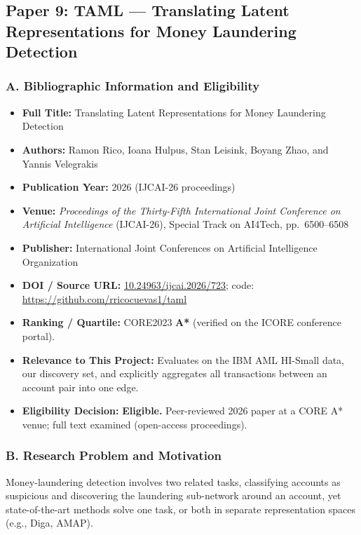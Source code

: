 \documentclass[11pt,a4paper]{article}
\begin{document}
\subsection{Paper 9: TAML --- Translating Latent Representations for Money Laundering Detection}
\label{sec:p9_taml}

\subsubsection*{A. Bibliographic Information and Eligibility}
\begin{itemize}[leftmargin=*]
    \item \textbf{Full Title:} Translating Latent Representations for Money Laundering Detection
    \item \textbf{Authors:} Ramon Rico, Ioana Hulpus, Stan Leisink, Boyang Zhao, and Yannis Velegrakis
    \item \textbf{Publication Year:} 2026 (IJCAI-26 proceedings)
    \item \textbf{Venue:} \textit{Proceedings of the Thirty-Fifth International Joint Conference on Artificial Intelligence} (IJCAI-26), Special Track on AI4Tech, pp.~6500--6508
    \item \textbf{Publisher:} International Joint Conferences on Artificial Intelligence Organization
    \item \textbf{DOI / Source URL:} \href{https://doi.org/10.24963/ijcai.2026/723}{10.24963/ijcai.2026/723}; code: \url{https://github.com/rricocuevas1/taml}
    \item \textbf{Ranking / Quartile:} CORE2023 \textbf{A*} (verified on the ICORE conference portal).
    \item \textbf{Relevance to This Project:} Evaluates on the IBM AML HI-Small data, our discovery set, and explicitly aggregates all transactions between an account pair into one edge.
    \item \textbf{Eligibility Decision:} \textbf{Eligible.} Peer-reviewed 2026 paper at a CORE A* venue; full text examined (open-access proceedings).
\end{itemize}

\subsubsection*{B. Research Problem and Motivation}
Money-laundering detection involves two related tasks, classifying accounts as suspicious and discovering the laundering sub-network around an account, yet state-of-the-art methods solve one task, or both in separate representation spaces (e.g., Diga, AMAP).
\end{document}
